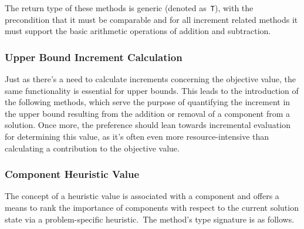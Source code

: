 \begin{center}

\end{center}

The return type of these methods is generic (denoted as~\texttt{T}), with the
precondition that it must be comparable and for all increment related methods it
must support the basic arithmetic operations of addition and subtraction.

\subsubsection*{Upper Bound Increment Calculation}

Just as there's a need to calculate increments concerning the objective value,
the same functionality is essential for upper bounds. This leads to the
introduction of the following methods, which serve the purpose of quantifying
the increment in the upper bound resulting from the addition or
removal of a component from a solution. Once more, the preference should lean
towards incremental evaluation for determining this value, as it's often even
more resource-intensive than calculating a contribution to the objective value.

\begin{center}

\end{center}

\subsubsection*{Component Heuristic Value}

The concept of a heuristic value is associated with a component and offers a
means to rank the importance of components with respect to the current solution
state via a problem-specific heuristic.~The method's type signature is as
follows.

\begin{center}
\end{center}

